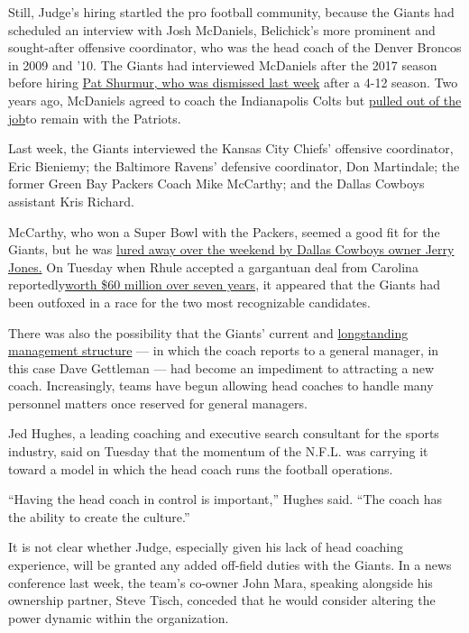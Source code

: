 Still, Judge's hiring startled the pro football community, because the
Giants had scheduled an interview with Josh McDaniels, Belichick's more
prominent and sought-after offensive coordinator, who was the head coach
of the Denver Broncos in 2009 and '10. The Giants had interviewed
McDaniels after the 2017 season before hiring
\href{https://www.nytimes3xbfgragh.onion/2019/12/30/sports/football/NFL-coaches-fired.html}{Pat
Shurmur, who was dismissed last week} after a 4-12 season. Two years
ago, McDaniels agreed to coach the Indianapolis Colts but
\href{http://www.nfl.com/news/story/0ap3000000915131/article/josh-mcdaniels-withdraws-from-colts-coaching-job}{pulled
out of the job}to remain with the Patriots.

Last week, the Giants interviewed the Kansas City Chiefs' offensive
coordinator, Eric Bieniemy; the Baltimore Ravens' defensive coordinator,
Don Martindale; the former Green Bay Packers Coach Mike McCarthy; and
the Dallas Cowboys assistant Kris Richard.

McCarthy, who won a Super Bowl with the Packers, seemed a good fit for
the Giants, but he was
\href{https://www.nytimes3xbfgragh.onion/2020/01/06/sports/football/mike-mccarthy-jerry-jones-cowboys.html}{lured
away over the weekend by Dallas Cowboys owner Jerry Jones.} On Tuesday
when Rhule accepted a gargantuan deal from Carolina
reportedly\href{https://twitter.com/AdamSchefter/status/1214583051478601728}{worth
\$60 million over seven years}, it appeared that the Giants had been
outfoxed in a race for the two most recognizable candidates.

There was also the possibility that the Giants' current and
\href{https://www.nytimes3xbfgragh.onion/2019/12/30/sports/football/pat-shurmur-dave-gettleman-giants.html}{longstanding
management structure} --- in which the coach reports to a general
manager, in this case Dave Gettleman --- had become an impediment to
attracting a new coach. Increasingly, teams have begun allowing head
coaches to handle many personnel matters once reserved for general
managers.

Jed Hughes, a leading coaching and executive search consultant for the
sports industry, said on Tuesday that the momentum of the N.F.L. was
carrying it toward a model in which the head coach runs the football
operations.

``Having the head coach in control is important,'' Hughes said. ``The
coach has the ability to create the culture.''

It is not clear whether Judge, especially given his lack of head
coaching experience, will be granted any added off-field duties with the
Giants. In a news conference last week, the team's co-owner John Mara,
speaking alongside his ownership partner, Steve Tisch, conceded that he
would consider altering the power dynamic within the organization.

